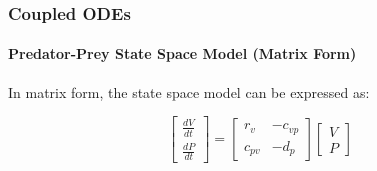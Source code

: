 	
	\begin{frame}
		\frametitle{Coupled ODEs}
		\framesubtitle{Predator-Prey State Space Model (Matrix Form)}
		In matrix form, the state space model can be expressed as:
		
		\[
		\left[\begin{array}{c}
		\frac{dV}{dt} \\
		\frac{dP}{dt}
		\end{array}\right]
		=
		\left[\begin{array}{cc}
		r_v & -c_{vp} \\
		c_{pv} & -d_p
		\end{array}\right]
		\left[\begin{array}{c}
		V \\
		P
		\end{array}\right]
		\]
		
	\end{frame}




\begin{frame}
\end{frame}

